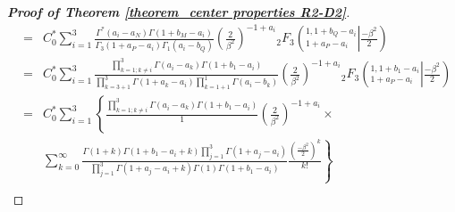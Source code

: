 \documentclass[12pt]{article}
\begin{document}
\begin{proof} [\textbf{Proof of Theorem \ref{theorem_center properties R2-D2}}]
{\begin{eqnarray*}
			&=&   C_0^\ast  \sum\limits_{i=1}^{3}   \frac{\Gamma^\ast (a_i-a_N) \Gamma(1+b_M-a_i)}  {\Gamma_3(1+a_P-a_i)\Gamma_1(a_i-b_Q)}(\frac{2}{\beta^2})^{-1+a_i}
			{}_{2}F_3
			\left(  _{1+a_P-a_i}^{1,1+b_Q-a_i}
			\left\vert\frac{-\beta^2}{2} \right. \right) \\
			&=&    C_0^\ast  \sum\limits_{i=1}^{3}
			\frac{ \prod\limits_{k=1;k\neq i}^3  \Gamma(a_i-a_k)  \Gamma(1+b_1-a_i)}
			{\prod\limits_{k=3+1}^3 \Gamma(1+a_k-a_i) \prod\limits_{k=1+1}^1 \Gamma(a_i-b_k)}(\frac{2}{\beta^2})^{-1+a_i}
			{}_{2}F_3
			\left(  _{1+a_P-a_i}^{1,1+b_1-a_i}
			\left\vert\frac{-\beta^2}{2} \right. \right) \\
			&=&    C_0^\ast  \sum\limits_{i=1}^{3} \left\{
			\frac{ \prod\limits_{k=1;k\neq i}^3  \Gamma(a_i-a_k)  \Gamma(1+b_1-a_i)}
			{1}(\frac{2}{\beta^2})^{-1+a_i}  \times  \right. \\
			&&	\left.
			\sum\limits_{k=0}^{\infty} \frac{\Gamma(1+k)\Gamma(1+b_1 - a_i +k) \prod\limits_{j=1}^3 \Gamma(1+a_j-a_i)}
			{\prod\limits_{j=1}^3 \Gamma(1+a_j-a_i+k)  \Gamma(1) \Gamma(1+b_1-a_i) } \frac{(\frac{-\beta^2}{2})^k}{k!}\right\}
			\\

\end{eqnarray*}}
\end{proof}
\end{document}

